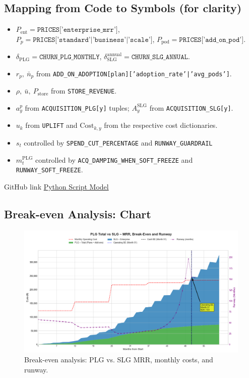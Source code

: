 \subsection{Mapping from Code to Symbols (for clarity)}
\begin{itemize}
  \item $P_{\mathrm{ent}} = \texttt{PRICES['enterprise\_mrr']}$, $P_p=\texttt{PRICES['standard'|'business'|'scale']}$, $P_{\mathrm{pod}}=\texttt{PRICES['add\_on\_pod']}$.
  \item $\delta_{\mathrm{PLG}}=\texttt{CHURN\_PLG\_MONTHLY}$, $\delta^{\mathrm{annual}}_{\mathrm{SLG}}=\texttt{CHURN\_SLG\_ANNUAL}$.
  \item $r_p,\ \bar{n}_p$ from \texttt{ADD\_ON\_ADOPTION[plan]['adoption\_rate'|'avg\_pods']}.
  \item $\rho,\ \bar{u},\ P_{\mathrm{store}}$ from \texttt{STORE\_REVENUE}.
  \item $a^p_y$ from \texttt{ACQUISITION\_PLG[y]} tuples; $A^{\mathrm{SLG}}_y$ from \texttt{ACQUISITION\_SLG[y]}.
  \item $u_k$ from \texttt{UPLIFT} and $\mathrm{Cost}_{k,y}$ from the respective cost dictionaries.
  \item $s_t$ controlled by \texttt{SPEND\_CUT\_PERCENTAGE} and \texttt{RUNWAY\_GUARDRAIL}
  \item $m^{\mathrm{PLG}}_t$ controlled by \texttt{ACQ\_DAMPING\_WHEN\_SOFT\_FREEZE} and \texttt{RUNWAY\_SOFT\_FREEZE}.
\end{itemize}

GitHub link \href{https://github.com/kuduk/intellyhub-businessplan/blob/main/breakeven.v2.02.py}{Python Script Model}

\newpage
\subsection{Break-even Analysis: Chart}
\begin{figure}[H]
    \centering 
    \includegraphics[width=\textwidth]{financial_projection.png}
    \caption{Break-even analysis: PLG vs. SLG MRR, monthly costs, and runway.}
    \label{fig:break_even_analysis}
\end{figure} 
